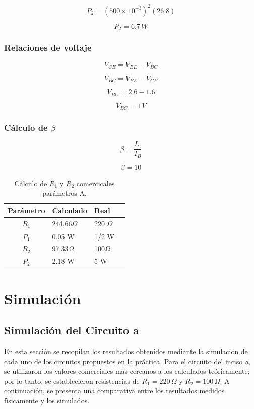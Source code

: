 \documentclass[journal]{IEEEtran}
\begin{document}
        \[
        P_2 = (500 \times 10^{-3})^2 (26.8)
        \]

        \[
        P_2 = 6.7\,W
        \]

        \subsubsection{Relaciones de voltaje}

        \[
        V_{CE} = V_{BE} - V_{BC}
        \]

        \[
        V_{BC} = V_{BE} - V_{CE}
        \]

        \[
        V_{BC} = 2.6 - 1.6
        \]

        \[
        V_{BC} = 1\,V
        \]

        \subsubsection{Cálculo de $\beta$}

        \[
        \beta = \frac{I_C}{I_B}
        \]

        \[
        \beta = 10
        \]
           \begin{table}[H]
                \centering
                \small 
                \begin{tabularx}{\columnwidth}{|c|X|X|X|}
                \hline
                \textbf{Parámetro} & \textbf{Calculado} & \textbf{Real} \\ \hline
                $R_1$  & 244.66$\Omega$ & 220 $\Omega$\\ \hline
                $P_1$  & 0.05 W & 1/2 W\\ \hline
                $R_2$  & 97.33$\Omega$ & 100$\Omega$\\ \hline
                $P_2$  & 2.18 W        & 5 W\\ \hline
                \end{tabularx}
                \caption{Cálculo de $R_1$ y $R_2$ comercicales parámetros A.}
                \label{tabla:erres.}
            \end{table}
        
\section{Simulación}
\subsection*{Simulación del Circuito a}
En esta sección se recopilan los resultados obtenidos mediante la simulación de cada uno de los circuitos propuestos en la práctica. Para el circuito del inciso \textit{a}, se utilizaron los valores comerciales más cercanos a los calculados teóricamente; por lo tanto, se establecieron resistencias de $R_1 = 220 \, \Omega$ y $R_2 = 100 \, \Omega$. A continuación, se presenta una comparativa entre los resultados medidos físicamente y los simulados.
\end{document}
